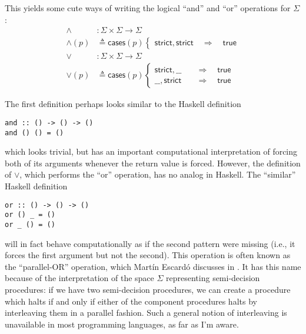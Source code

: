This yields some cute ways of writing the logical ``and'' and ``or'' operations for $\Sigma$:
\begin{align*}
\wedge &: \Sigma \times \Sigma \to \Sigma
\\ \wedge(p) &\triangleq \mathsf{cases}(p)
\begin{cases}
\mathsf{strict} , \mathsf{strict}
  \quad \Longrightarrow \quad \mathsf{true}
\end{cases}
\\
\vee &: \Sigma \times \Sigma \to \Sigma
\\ \vee(p) &\triangleq \mathsf{cases}(p)
\begin{cases}
\mathsf{strict} , \_\_
  \quad &\Longrightarrow \quad \mathsf{true}
\\  \_\_ , \mathsf{strict}
  \quad &\Longrightarrow \quad \mathsf{true}
\end{cases}
\end{align*}

The first definition perhaps looks similar to the Haskell definition
\begin{verbatim}
and :: () -> () -> ()
and () () = ()
\end{verbatim}
which looks trivial, but has an important computational interpretation of forcing both of its arguments whenever the return value is forced. However, the definition of $\vee$, which performs the ``or'' operation, has no analog in Haskell. The ``similar'' Haskell definition
\begin{verbatim}
or :: () -> () -> ()
or () _ = ()
or _ () = ()
\end{verbatim}
will in fact behave computationally as if the second pattern were missing (i.e., it forces the first argument but not the second). This operation is often known as the ``parallel-OR'' operation, which Mart\'in Escard\'o discusses in \cite{escardo2004}. It has this name because of the interpretation of the space $\Sigma$ representing semi-decision procedures: if we have two semi-decision procedures, we can create a procedure which halts if and only if either of the component procedures halts by interleaving them in a parallel fashion. Such a general notion of interleaving is unavailable in most programming languages, as far as I'm aware.

